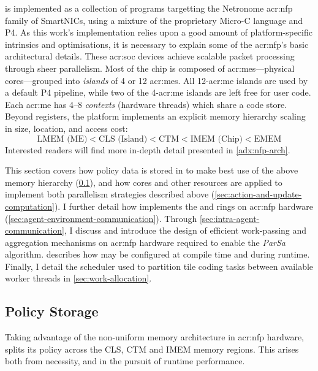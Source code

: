 \approachshort{} is implemented as a collection of programs targetting the Netronome \gls{acr:nfp} family of SmartNICs, using a mixture of the proprietary Micro-C language and P4.
As this work's implementation relies upon a good amount of platform-specific intrinsics and optimisations, it is necessary to explain some of the \gls{acr:nfp}'s basic architectural details.
These \gls{acr:soc} devices achieve scalable packet processing through sheer parallelism.
Most of the chip is composed of \glspl{acr:me}---physical cores---grouped into \emph{islands} of 4 or 12 \glspl{acr:me}.
All 12-\gls{acr:me} islands are used by a default P4 pipeline, while two of the 4-\gls{acr:me} islands are left free for user code.
Each \gls{acr:me} has \numrange{4}{8} \emph{contexts} (hardware threads) which share a code store.
Beyond registers, the platform implements an explicit memory hierarchy scaling in size, location, and access cost:
$$\text{LMEM (ME)} < \text{CLS (Island)} < \text{CTM} < \text{IMEM (Chip)} < \text{EMEM}$$
Interested readers will find more in-depth detail presented in \cref{adx:nfp-arch}.

This section covers how policy data is stored in \approachshort{} to make best use of the above memory hierarchy (\cref{sec:policy-storage}), and how cores and other resources are applied to implement both parallelism strategies described above (\cref{sec:action-and-update-computation}).
I further detail how \approachshort{} implements the \inring{} and \outring{} rings on \gls{acr:nfp} hardware (\cref{sec:agent-environment-communication}).
Through \cref{sec:intra-agent-communication}, I discuss and introduce the design of efficient work-passing and aggregation mechanisms on \gls{acr:nfp} hardware required to enable the \emph{ParSa} algorithm.
 describes how \approachshort{} may be configured at compile time and during runtime.
Finally, I detail the scheduler used to partition tile coding tasks between available worker threads in \cref{sec:work-allocation}.


\subsection{Policy Storage}\label{sec:policy-storage}
Taking advantage of the non-uniform memory architecture in \gls{acr:nfp} hardware, \approachshort{} splits its policy across the CLS, CTM and IMEM memory regions.
This arises both from necessity, and in the pursuit of runtime performance.

